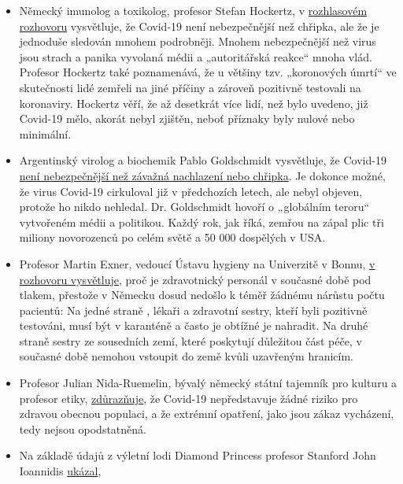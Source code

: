 \begin{itemize}
\tightlist
\item
  Německý imunolog a toxikolog, profesor Stefan Hockertz, v
  \href{https://www.youtube.com/watch?v=7wfb-B0BWmo}{rozhlasovém
  rozhovoru} vysvětluje, že Covid-19 není nebezpečnější než chřipka, ale
  že je jednoduše sledován mnohem podrobněji. Mnohem nebezpečnější než
  virus jsou strach a panika vyvolaná médii a „autoritářská reakce``
  mnoha vlád. Profesor Hockertz také poznamenává, že u většiny tzv.
  „koronových úmrtí`` ve skutečnosti lidé zemřeli na jiné příčiny a
  zároveň pozitivně testovali na koronaviry. Hockertz věří, že až
  desetkrát více lidí, než bylo uvedeno, již Covid-19 mělo, akorát nebyl
  zjištěn, neboť příznaky byly nulové nebo minimální.
\item
  Argentinský virolog a biochemik Pablo Goldschmidt vysvětluje, že
  Covid-19
  \href{https://www.clarin.com/buena-vida/coronavirus-panico-injustificado-dice-virologo-argentino-francia_0_yVcmJ4RM.html}{není
  nebezpečnější než závažná nachlazení nebo chřipka}. Je dokonce možné,
  že virus Covid-19 cirkuloval již v předchozích letech, ale nebyl
  objeven, protože ho nikdo nehledal. Dr. Goldschmidt hovoří o
  „globálním teroru`` vytvořeném médii a politikou. Každý rok, jak říká,
  zemřou na zápal plic tři miliony novorozenců po celém světě a 50 000
  dospělých v USA.
\item
  Profesor Martin Exner, vedoucí Ústavu hygieny na Univerzitě v Bonnu,
  \href{https://www.youtube.com/watch?v=9mI9trSm3PY}{v rozhovoru
  vysvětluje}, proč je zdravotnický personál v současné době pod tlakem,
  přestože v Německu dosud nedošlo k téměř žádnému nárůstu počtu
  pacientů: Na jedné straně , lékaři a zdravotní sestry, kteří byli
  pozitivně testováni, musí být v karanténě a často je obtížné je
  nahradit. Na druhé straně sestry ze sousedních zemí, které poskytují
  důležitou část péče, v současné době nemohou vstoupit do země kvůli
  uzavřeným hranicím.
\item
  Profesor Julian Nida-Ruemelin, bývalý německý státní tajemník pro
  kulturu a profesor etiky,
  \href{https://www.zdf.de/nachrichten/zdf-morgenmagazin/julian-nida-ruemelin-zur-corona-krise-100.html}{zdůrazňuje},
  že Covid-19 nepředstavuje žádné riziko pro zdravou obecnou populaci, a
  že extrémní opatření, jako jsou zákaz vycházení, tedy nejsou
  opodstatněná.
\item
  Na základě údajů z výletní lodi Diamond Princess profesor Stanford
  John Ioannidis
  \href{https://www.statnews.com/2020/03/17/a-fiasco-in-the-making-as-the-coronavirus-pandemic-takes-hold-we-are-making-decisions-without-reliable-data/}{ukázal},

\end{itemize}
